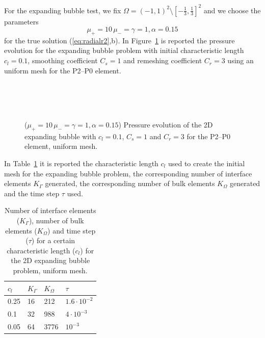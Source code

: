 \documentclass[a4paper,12pt,onecolumn]{article}
\begin{document}
For the expanding bubble test, we fix $\Omega = (-1,1)^2 \setminus [-\frac13,\frac13]^2$ and we choose the parameters
\begin{equation*}
\mu_+ = 10\,\mu_- = \gamma = 1,\alpha = 0.15
\end{equation*}
for the true solution (\ref{eq:radialr2},b). In Figure~\ref{fig:expanding_bubble_uniform} is reported the pressure evolution for the expanding bubble problem with initial characteristic length $c_l=0.1$, smoothing coefficient $C_s=1$ and remeshing coefficient $C_r=3$ using an uniform mesh for the P2--P0 element.
\begin{figure}[htbp]
  \centering
  \\
  \quad
  \\
  \quad
  \\
  \caption{($\mu_+ = 10\,\mu_- = \gamma = 1,\alpha = 0.15$) Pressure evolution of the 2D expanding bubble with $c_l=0.1$, $C_s=1$ and $C_r=3$ for the P2--P0 element, uniform mesh.}
  \label{fig:expanding_bubble_uniform}
\end{figure}

In Table~\ref{tab:expandingbubble2Delements} it is reported the characteristic length $c_l$ used to create the initial mesh for the expanding bubble problem, the corresponding number of interface elements $K_\Gamma$ generated, the corresponding number of bulk elements $K_\Omega$ generated and the time step $\tau$ used. 
\begin{table}
 \center
\begin{tabular}{llll}
\hline
$c_l$ & $K_\Gamma$ & $K_\Omega$ & $\tau$\\
\hline
0.25 & 16 & 212 & $1.6\cdot10^{-2}$ \\
0.1 & 32 & 988 & $4\cdot10^{-3}$ \\
0.05 & 64 & 3776 & $10^{-3}$ \\
\hline
\end{tabular}
\caption{Number of interface elements ($K_\Gamma$), number of bulk elements ($K_\Omega$) and time step ($\tau$) for a certain characteristic length ($c_l$) for the 2D expanding bubble problem, uniform mesh.}
\label{tab:expandingbubble2Delements}
\end{table}
\end{document}
